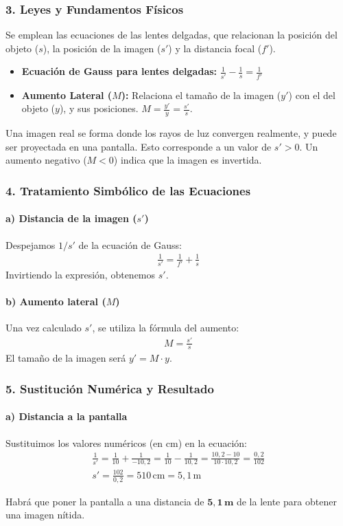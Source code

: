 \subsubsection*{3. Leyes y Fundamentos Físicos}
Se emplean las ecuaciones de las lentes delgadas, que relacionan la posición del objeto ($s$), la posición de la imagen ($s'$) y la distancia focal ($f'$).
\begin{itemize}
    \item \textbf{Ecuación de Gauss para lentes delgadas:} $\frac{1}{s'} - \frac{1}{s} = \frac{1}{f'}$
    \item \textbf{Aumento Lateral ($M$):} Relaciona el tamaño de la imagen ($y'$) con el del objeto ($y$), y sus posiciones. $M = \frac{y'}{y} = \frac{s'}{s}$.
\end{itemize}
Una imagen real se forma donde los rayos de luz convergen realmente, y puede ser proyectada en una pantalla. Esto corresponde a un valor de $s' > 0$. Un aumento negativo ($M<0$) indica que la imagen es invertida.

\subsubsection*{4. Tratamiento Simbólico de las Ecuaciones}
\paragraph{a) Distancia de la imagen ($s'$)}
Despejamos $1/s'$ de la ecuación de Gauss:
\begin{gather}
    \frac{1}{s'} = \frac{1}{f'} + \frac{1}{s}
\end{gather}
Invirtiendo la expresión, obtenemos $s'$.

\paragraph{b) Aumento lateral ($M$)}
Una vez calculado $s'$, se utiliza la fórmula del aumento:
\begin{gather}
    M = \frac{s'}{s}
\end{gather}
El tamaño de la imagen será $y' = M \cdot y$.

\subsubsection*{5. Sustitución Numérica y Resultado}
\paragraph{a) Distancia a la pantalla}
Sustituimos los valores numéricos (en cm) en la ecuación:
\begin{gather}
    \frac{1}{s'} = \frac{1}{10} + \frac{1}{-10,2} = \frac{1}{10} - \frac{1}{10,2} = \frac{10,2 - 10}{10 \cdot 10,2} = \frac{0,2}{102} \\
    s' = \frac{102}{0,2} = 510 \, \text{cm} = 5,1 \, \text{m}
\end{gather}
\begin{cajaresultado}
Habrá que poner la pantalla a una distancia de $\boldsymbol{5,1\,\textbf{m}}$ de la lente para obtener una imagen nítida.
\end{cajaresultado}

